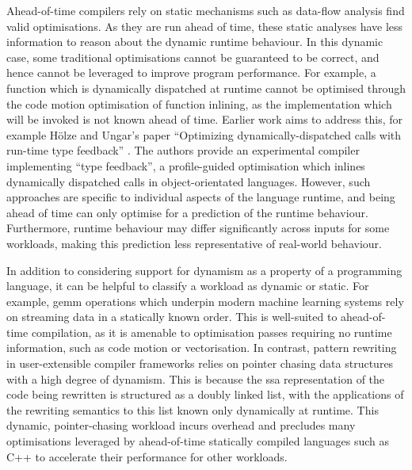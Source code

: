 Ahead-of-time compilers rely on static mechanisms such as data-flow analysis find valid optimisations.
As they are run ahead of time, these static analyses have less information to reason about the dynamic runtime behaviour. In this dynamic case, some traditional optimisations cannot be guaranteed to be correct, and hence cannot be leveraged to improve program performance. For example, a function which is dynamically dispatched at runtime cannot be optimised through the code motion optimisation of function inlining, as the implementation which will be invoked is not known ahead of time.
Earlier work aims to address this, for example H\"olze and Ungar's paper ``Optimizing dynamically-dispatched calls with run-time type feedback'' \cite{holzleOptimizingDynamicallydispatchedCalls1994}. The authors provide an experimental compiler implementing ``type feedback'', a profile-guided optimisation which inlines dynamically dispatched calls in object-orientated languages.
However, such approaches are specific to individual aspects of the language runtime, and being ahead of time can only optimise for a prediction of the runtime behaviour.
Furthermore, runtime behaviour may differ significantly across inputs for some workloads, making this prediction less representative of real-world behaviour.

In addition to considering support for dynamism as a property of a programming language, it can be helpful to classify a workload as dynamic or static.
For example, \ac{gemm} operations which underpin modern machine learning systems rely on streaming data in a statically known order. This is well-suited to ahead-of-time compilation, as it is amenable to optimisation passes requiring no runtime information, such as code motion or vectorisation.
In contrast, pattern rewriting in user-extensible compiler frameworks relies on pointer chasing data structures with a high degree of dynamism. This is because the \ac{ssa} representation of the code being rewritten is structured as a doubly linked list, with the applications of the rewriting semantics to this list known only dynamically at runtime.
This dynamic, pointer-chasing workload incurs overhead and precludes many optimisations leveraged by ahead-of-time statically compiled languages such as C++ to accelerate their performance for other workloads.





